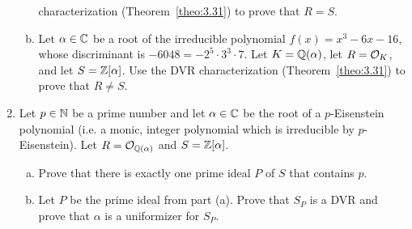 \begin{enumerate}[leftmargin=1.5cm, label={{\bf A6-\arabic*}}]
\begin{enumerate}[(a)]
        characterization (Theorem~\ref{theo:3.31}) to prove that $R = S$. 
        \item Let $\alpha \in \mathbb{C}$ be a root of the irreducible polynomial 
        $f(x) = x^3 - 6x - 16$, whose discriminant is 
        $-6048 = -2^5 \cdot 3^3 \cdot 7$. Let $K = \mathbb{Q}(\alpha)$, 
        let $R = {\cal O}_K$, and let $S = \mathbb{Z}[\alpha]$. Use the DVR 
        characterization (Theorem~\ref{theo:3.31}) to prove that $R \neq S$. 
    \end{enumerate}
    \item \label{A6-4} Let $p \in \mathbb{N}$ be a prime number and let $\alpha \in \mathbb{C}$ 
    be the root of a $p$-Eisenstein polynomial (i.e. a monic, integer polynomial 
    which is irreducible by $p$-Eisenstein). Let $R = {\cal O}_{\mathbb{Q}(\alpha)}$ 
    and $S = \mathbb{Z}[\alpha]$. 
    \begin{enumerate}[(a)]
        \item Prove that there is exactly one prime ideal $P$ of $S$ that contains $p$. 
        \item Let $P$ be the prime ideal from part (a). Prove that $S_P$ is a DVR 
        and prove that $\alpha$ is a uniformizer for $S_P$. 
    \end{enumerate}
\end{enumerate}


